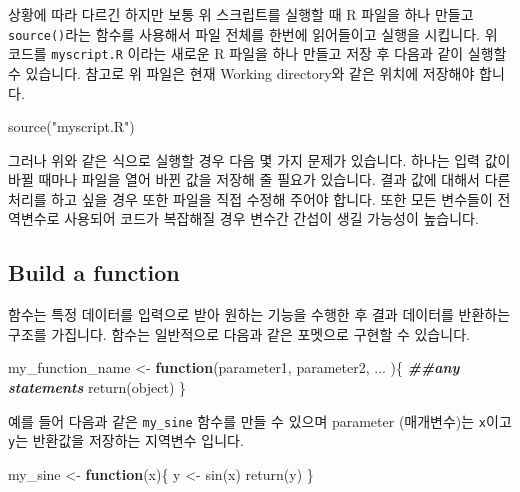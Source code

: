 \documentclass[
]{book}
\newenvironment{Shaded}{\begin{snugshade}}{\end{snugshade}}
\newcommand{\ControlFlowTok}[1]{\textcolor[rgb]{0.13,0.29,0.53}{\textbf{#1}}}
\newcommand{\DocumentationTok}[1]{\textcolor[rgb]{0.56,0.35,0.01}{\textbf{\textit{#1}}}}
\newcommand{\FunctionTok}[1]{\textcolor[rgb]{0.00,0.00,0.00}{#1}}
\newcommand{\NormalTok}[1]{#1}
\newcommand{\OtherTok}[1]{\textcolor[rgb]{0.56,0.35,0.01}{#1}}
\newcommand{\StringTok}[1]{\textcolor[rgb]{0.31,0.60,0.02}{#1}}
\begin{document}
상황에 따라 다르긴 하지만 보통 위 스크립트를 실행할 때 R 파일을 하나 만들고 \texttt{source()}라는 함수를 사용해서 파일 전체를 한번에 읽어들이고 실행을 시킵니다. 위 코드를 \texttt{myscript.R} 이라는 새로운 R 파일을 하나 만들고 저장 후 다음과 같이 실행할 수 있습니다. 참고로 위 파일은 현재 Working directory와 같은 위치에 저장해야 합니다.

\begin{Shaded}
\begin{Highlighting}[]
\FunctionTok{source}\NormalTok{(}\StringTok{"myscript.R"}\NormalTok{)}
\end{Highlighting}
\end{Shaded}

그러나 위와 같은 식으로 실행할 경우 다음 몇 가지 문제가 있습니다. 하나는 입력 값이 바뀔 때마나 파일을 열어 바뀐 값을 저장해 줄 필요가 있습니다. 결과 값에 대해서 다른 처리를 하고 싶을 경우 또한 파일을 직접 수정해 주어야 합니다. 또한 모든 변수들이 전역변수로 사용되어 코드가 복잡해질 경우 변수간 간섭이 생길 가능성이 높습니다.

\hypertarget{build-a-function}{%
\subsection{Build a function}\label{build-a-function}}

함수는 특정 데이터를 입력으로 받아 원하는 기능을 수행한 후 결과 데이터를 반환하는 구조를 가집니다. 함수는 일반적으로 다음과 같은 포멧으로 구현할 수 있습니다.

\begin{Shaded}
\begin{Highlighting}[]
\NormalTok{my\_function\_name }\OtherTok{\textless{}{-}} \ControlFlowTok{function}\NormalTok{(parameter1, parameter2, ... )\{}
  \DocumentationTok{\#\#any statements}
  \FunctionTok{return}\NormalTok{(object)}
\NormalTok{\}}
\end{Highlighting}
\end{Shaded}

예를 들어 다음과 같은 \texttt{my\_sine} 함수를 만들 수 있으며 parameter (매개변수)는 \texttt{x}이고 \texttt{y}는 반환값을 저장하는 지역변수 입니다.

\begin{Shaded}
\begin{Highlighting}[]
\NormalTok{my\_sine }\OtherTok{\textless{}{-}} \ControlFlowTok{function}\NormalTok{(x)\{}
\NormalTok{    y }\OtherTok{\textless{}{-}} \FunctionTok{sin}\NormalTok{(x)}
    \FunctionTok{return}\NormalTok{(y)}
\NormalTok{\}}
\end{Highlighting}
\end{Shaded}
\end{document}
